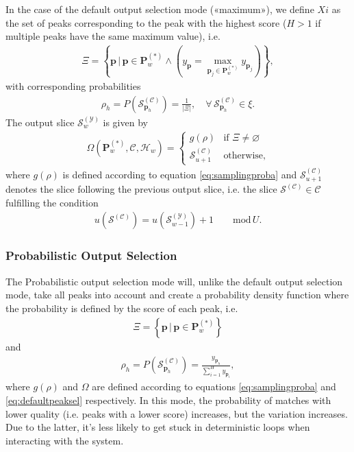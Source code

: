 In the case of the default output selection mode («maximum»), we define $Xi$ as the set of peaks corresponding to the peak with the highest score ($H>1$ if multiple peaks have the same maximum value), i.e.
	\begin{align}
		\Xi = \left\lbrace \bm p \,\bigg\vert	\, \bm p \in \bm P^{(\ast)}_w \wedge \left( y_{\bm p} = \max_{\bm p_j \in \bm P^{(\ast)}_w} y_{\bm p_j}\right)\right\rbrace,
	\end{align}
	with corresponding probabilities
	\begin{align}\label{eq:max-rho}
		\rho_h = P\left(\mathcal S^{(\mathcal C)}_{\bm p_h}\right) = \frac{1}{\left\lvert \Xi \right\rvert}, \quad \forall \,\mathcal S^{(\mathcal C)}_{\bm p_h} \in \xi.
	\end{align}
	The output slice $\mathcal S^{(\mathcal Y)}_w$ is given by
	\begin{align}\label{eq:defaultpeaksel}
		\Omega\left(\bm P^{(\ast)}_w, \mathcal C, \mathcal H_w\right)
		= \left\lbrace\begin{array}{ll}
			g(\rho) & \text{if } \Xi \ne \varnothing\\
			\mathcal S^{(\mathcal C)}_{u+1} & \text{otherwise},
		\end{array}\right.
	\end{align}
	where $g(\rho)$ is defined according to equation \ref{eq:samplingproba} and $\mathcal S^{(\mathcal C)}_{u+1}$ denotes the slice following the previous output slice, i.e. the slice $\mathcal S^{(\mathcal C)}\in \mathcal C$ fulfilling the condition
	\begin{align}\label{eq:defaultpeaksel-emptycase}
		u\left(\mathcal S^{(\mathcal C)}\right) = u\left(\mathcal S^{(\mathcal Y)}_{w-1}\right) + 1 \qquad \text{mod}\, U.
	\end{align}
	

\subsubsection{Probabilistic Output Selection}\label{ssec:proba-output-sel}
The Probabilistic output selection mode will, unlike the default output selection mode, take all peaks into account and create a probability density function where the probability is defined by the score of each peak, i.e.
	\begin{align}
		\Xi = \left\lbrace \bm p \, \bigg\vert \, \bm p \in \bm P^{(\ast)}_w\right\rbrace
	\end{align}
	and
	\begin{align}\label{eq:proba-rho}
		\rho_h = P\left(\mathcal S^{(\mathcal C)}_{\bm p_h}\right) = \frac{y_{\bm p_h}}{\sum_{i = 1}^H y_{\bm p_i}},
	\end{align}
	where $g(\rho)$ and $\Omega$ are defined according to equations \ref{eq:samplingproba} and \ref{eq:defaultpeaksel} respectively. In this mode, the probability of matches with lower quality (i.e. peaks with a lower score) increases, but the variation increases. Due to the latter, it's less likely to get stuck in deterministic loops when interacting with the system.

